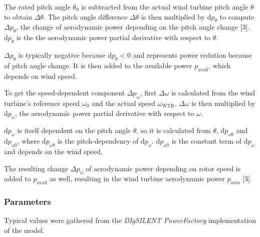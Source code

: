 \documentclass[
  a4paper,
  DIV=11,
  numbers=noendperiod]{scrartcl}
\begin{document}
The rated pitch angle \(\theta_0\) is subtracted from the actual wind
turbine pitch angle \(\theta\) to obtain \(\Delta\theta\). The pitch
angle difference \(\Delta\theta\) is then multiplied by
\(\mathrm{d}p_{\theta}\) to compute \(\Delta p_\mathrm{\theta}\), the
change of aerodynamic power depending on the pitch angle change {[}3{]}.
\(\mathrm{d}p_{\theta}\) is the the aerodynamic power partial derivative
with respect to \(\theta\).

\(\Delta p_\mathrm{\theta}\) is typically negative because
\(\mathrm{d}p_{\theta}<0\) and represents power redution because of
pitch angle change. It is then added to the available power
\(p_\mathrm{avail}\), which depends on wind speed.

To get the speed-dependent component \(\Delta p_\mathrm{\omega}\), first
\(\Delta\omega\) is calculated from the wind turbine's reference speed
\(\omega_\mathrm{0}\) and the actual speed \(\omega_\mathrm{WTR}\).
\(\Delta\omega\) is then multiplied by \(\mathrm{d}p_\mathrm{\omega}\),
the aerodynamic power partial derivative with respect to \(\omega\).

\(\mathrm{d}p_\mathrm{\omega}\) is itself dependent on the pitch angle
\(\theta\), so it is calculated from \(\theta\),
\(\mathrm{d}p_\mathrm{\omega\theta}\) and
\(\mathrm{d}p_\mathrm{\omega0}\), where
\(\mathrm{d}p_\mathrm{\omega\theta}\) is the pitch-dependency of
\(\mathrm{d}p_\mathrm{\omega}\). \(\mathrm{d}p_{\omega0}\) is the
constant term of \(\mathrm{d}p_{\omega}\) and depends on the wind speed.

The resulting change \(\Delta p_\mathrm{\omega}\) of aerodynamic power
depending on rotor speed is added to \(p_\mathrm{avail}\) as well,
resulting in the wind turbine aerodynamic power \(p_\mathrm{aero}\)
{[}3{]}.

\subsubsection{Parameters}\label{parameters-4}

Typical values were gathered from the \emph{DIgSILENT PowerFactory}
implementation of the model.
\end{document}
